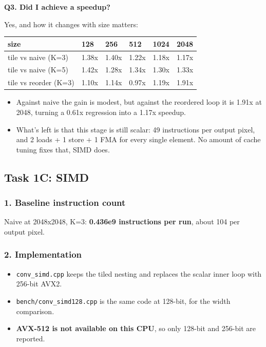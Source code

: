 \documentclass[
  10pt,
]{article}
\newcounter{none} %
\providecommand{\tightlist}{%
  \setlength{\itemsep}{0pt}\setlength{\parskip}{0pt}}
\begin{document}
\textbf{Q3. Did I achieve a speedup?}

Yes, and how it changes with size matters:

{\def\LTcaptype{none} %
\begin{longtable}[]{@{}llllll@{}}
\toprule\noalign{}
size & 128 & 256 & 512 & 1024 & 2048 \\
\midrule\noalign{}
\endhead
\bottomrule\noalign{}
\endlastfoot
tile vs naive (K=3) & 1.38x & 1.40x & 1.22x & 1.18x & 1.17x \\
tile vs naive (K=5) & 1.42x & 1.28x & 1.34x & 1.30x & 1.33x \\
tile vs reorder (K=3) & 1.10x & 1.14x & 0.97x & 1.19x & 1.91x \\
\end{longtable}
}

\begin{itemize}
\tightlist
\item
  Against naive the gain is modest, but against the reordered loop it is 1.91x
  at 2048, turning a 0.61x regression into a 1.17x speedup.
\item
  What's left is that this stage is still scalar: 49 instructions per output
  pixel, and 2 loads + 1 store + 1 FMA for every single element. No amount of
  cache tuning fixes that, SIMD does.
\end{itemize}

\subsection{Task 1C: SIMD}\label{task-1c-simd}

\subsubsection{1. Baseline instruction
count}\label{baseline-instruction-count}

Naive at 2048x2048, K=3: \textbf{0.436e9 instructions per run}, about 104 per
output pixel.

\subsubsection{2. Implementation}\label{implementation}

\begin{itemize}
\tightlist
\item
  \texttt{conv\_simd.cpp} keeps the tiled nesting and replaces the scalar inner
  loop with 256-bit AVX2.
\item
  \texttt{bench/conv\_simd128.cpp} is the same code at 128-bit, for the
  width comparison.
\item
  \textbf{AVX-512 is not available on this CPU}, so only 128-bit and 256-bit
  are reported.
\end{itemize}
\end{document}
